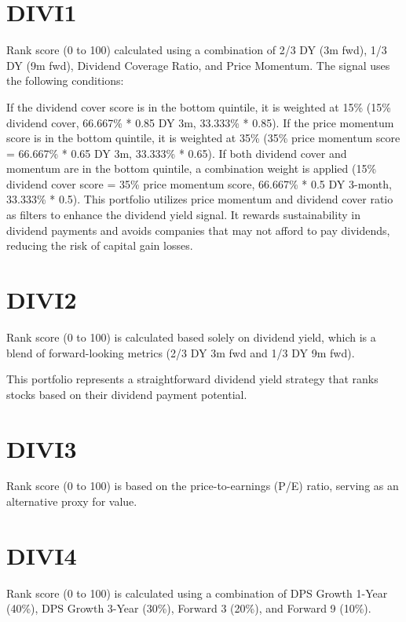 \documentclass[11pt,preprint, authoryear]{elsarticle}
\numberwithin{equation}{section}
\numberwithin{figure}{section}
\numberwithin{table}{section}
\begin{document}
\hypertarget{divi1}{%
\section{DIVI1}\label{divi1}}

Rank score (0 to 100) calculated using a combination of 2/3 DY (3m fwd),
1/3 DY (9m fwd), Dividend Coverage Ratio, and Price Momentum. The signal
uses the following conditions:

If the dividend cover score is in the bottom quintile, it is weighted at
15\% (15\% dividend cover, 66.667\% * 0.85 DY 3m, 33.333\% * 0.85). If
the price momentum score is in the bottom quintile, it is weighted at
35\% (35\% price momentum score = 66.667\% * 0.65 DY 3m, 33.333\% *
0.65). If both dividend cover and momentum are in the bottom quintile, a
combination weight is applied (15\% dividend cover score = 35\% price
momentum score, 66.667\% * 0.5 DY 3-month, 33.333\% * 0.5). This
portfolio utilizes price momentum and dividend cover ratio as filters to
enhance the dividend yield signal. It rewards sustainability in dividend
payments and avoids companies that may not afford to pay dividends,
reducing the risk of capital gain losses.

\hypertarget{divi2}{%
\section{DIVI2}\label{divi2}}

Rank score (0 to 100) is calculated based solely on dividend yield,
which is a blend of forward-looking metrics (2/3 DY 3m fwd and 1/3 DY 9m
fwd).

This portfolio represents a straightforward dividend yield strategy that
ranks stocks based on their dividend payment potential.

\hypertarget{divi3}{%
\section{DIVI3}\label{divi3}}

Rank score (0 to 100) is based on the price-to-earnings (P/E) ratio,
serving as an alternative proxy for value.

\hypertarget{divi4}{%
\section{DIVI4}\label{divi4}}

Rank score (0 to 100) is calculated using a combination of DPS Growth
1-Year (40\%), DPS Growth 3-Year (30\%), Forward 3 (20\%), and Forward 9
(10\%).
\end{document}
